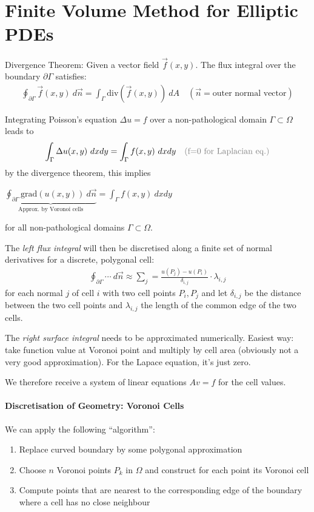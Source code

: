 \section{Finite Volume Method for Elliptic PDEs}
\begin{addmargin}[1em]{0em}
    {\color{teal}
        Divergence Theorem: Given a vector field $\vec{f}(x,y)$.
        The flux integral over the boundary $\partial\Gamma$ satisfies:
        \begin{align*}
            \oint_{\partial\Gamma}\vec{f}(x,y)\ d\vec{n} = \int_\Gamma \mathrm{div}(\vec{f}(x,y))\ dA
            \quad(\vec{n} = \text{outer normal vector})
        \end{align*}
    }
\end{addmargin}

Integrating Poisson's equation $\Delta u = f$ over a non-pathological domain $\Gamma\subset\Omega$ leads to
\begin{align*}
    \int_\Gamma \Delta u(x,y)\ dxdy = \int_\Gamma f(x,y)\ dxdy\quad{\color{gray}\text{(f=0 for Laplacian eq.)}}
\end{align*}
by the divergence theorem, this implies

\colorbox{shadecolor}{$
    \displaystyle
    \underbrace{\oint_{\partial\Gamma}\mathrm{grad}(u(x,y))\ d\vec{n}}_\text{Approx. by Voronoi cells}
    = \int_\Gamma f(x,y)\ dxdy
$}

for all non-pathological domains $\Gamma\subset\Omega$.

The \emph{left flux integral} will then be discretised along a finite set of normal derivatives 
for a discrete, polygonal cell:
\begin{align*}
    \oint_{\partial\Gamma}\cdots\ d\vec{n} \approx \sum_j = \frac{u(P_j) - u(P_i)}{\delta_{i,j}}\cdot \lambda_{i,j}
\end{align*}
for each normal $j$ of cell $i$ with two cell points $P_i,P_j$ and let 
$\delta_{i,j}$ be the distance between the two cell points
and $\lambda_{i,j}$ the length of the common edge of the two cells.

The \emph{right surface integral} needs to be approximated numerically.
Easiest way: take function value at Voronoi point and multiply by cell area
(obviously not a very good approximation). For the Lapace equation, it's just zero.

We therefore receive a system of linear equations $Av=f$ for the cell values.

\paragraph{Discretisation of Geometry: Voronoi Cells}
We can apply the following ``algorithm'':
\begin{enumerate}
    \item Replace curved boundary by some polygonal approximation
    \item Choose $n$ Voronoi points $P_k$ in $\Omega$ and construct for each point its Voronoi cell
    \item Compute points that are nearest to the corresponding edge of the boundary where a cell has no close neighbour
\end{enumerate}

